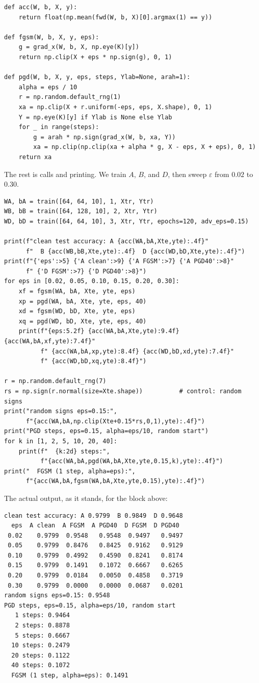 \begin{lab}
\begin{verbatim}
def acc(W, b, X, y):
    return float(np.mean(fwd(W, b, X)[0].argmax(1) == y))

def fgsm(W, b, X, y, eps):
    g = grad_x(W, b, X, np.eye(K)[y])
    return np.clip(X + eps * np.sign(g), 0, 1)

def pgd(W, b, X, y, eps, steps, Ylab=None, arah=1):
    alpha = eps / 10
    r = np.random.default_rng(1)
    xa = np.clip(X + r.uniform(-eps, eps, X.shape), 0, 1)
    Y = np.eye(K)[y] if Ylab is None else Ylab
    for _ in range(steps):
        g = arah * np.sign(grad_x(W, b, xa, Y))
        xa = np.clip(np.clip(xa + alpha * g, X - eps, X + eps), 0, 1)
    return xa
\end{verbatim}
\end{lab}

The rest is calls and printing. We train $A$, $B$, and $D$, then sweep
$\varepsilon$ from $0.02$ to $0.30$.

\begin{verbatim}
WA, bA = train([64, 64, 10], 1, Xtr, Ytr)
WB, bB = train([64, 128, 10], 2, Xtr, Ytr)
WD, bD = train([64, 64, 10], 3, Xtr, Ytr, epochs=120, adv_eps=0.15)

print(f"clean test accuracy: A {acc(WA,bA,Xte,yte):.4f}"
      f"  B {acc(WB,bB,Xte,yte):.4f}  D {acc(WD,bD,Xte,yte):.4f}")
print(f"{'eps':>5} {'A clean':>9} {'A FGSM':>7} {'A PGD40':>8}"
      f" {'D FGSM':>7} {'D PGD40':>8}")
for eps in [0.02, 0.05, 0.10, 0.15, 0.20, 0.30]:
    xf = fgsm(WA, bA, Xte, yte, eps)
    xp = pgd(WA, bA, Xte, yte, eps, 40)
    xd = fgsm(WD, bD, Xte, yte, eps)
    xq = pgd(WD, bD, Xte, yte, eps, 40)
    print(f"{eps:5.2f} {acc(WA,bA,Xte,yte):9.4f} {acc(WA,bA,xf,yte):7.4f}"
          f" {acc(WA,bA,xp,yte):8.4f} {acc(WD,bD,xd,yte):7.4f}"
          f" {acc(WD,bD,xq,yte):8.4f}")

r = np.random.default_rng(7)
rs = np.sign(r.normal(size=Xte.shape))          # control: random signs
print("random signs eps=0.15:",
      f"{acc(WA,bA,np.clip(Xte+0.15*rs,0,1),yte):.4f}")
print("PGD steps, eps=0.15, alpha=eps/10, random start")
for k in [1, 2, 5, 10, 20, 40]:
    print(f"  {k:2d} steps:",
          f"{acc(WA,bA,pgd(WA,bA,Xte,yte,0.15,k),yte):.4f}")
print("  FGSM (1 step, alpha=eps):",
      f"{acc(WA,bA,fgsm(WA,bA,Xte,yte,0.15),yte):.4f}")
\end{verbatim}

The actual output, as it stands, for the block above:

\begin{verbatim}
clean test accuracy: A 0.9799  B 0.9849  D 0.9648
  eps  A clean  A FGSM  A PGD40  D FGSM  D PGD40
 0.02    0.9799  0.9548   0.9548  0.9497   0.9497
 0.05    0.9799  0.8476   0.8425  0.9162   0.9129
 0.10    0.9799  0.4992   0.4590  0.8241   0.8174
 0.15    0.9799  0.1491   0.1072  0.6667   0.6265
 0.20    0.9799  0.0184   0.0050  0.4858   0.3719
 0.30    0.9799  0.0000   0.0000  0.0687   0.0201
random signs eps=0.15: 0.9548
PGD steps, eps=0.15, alpha=eps/10, random start
   1 steps: 0.9464
   2 steps: 0.8878
   5 steps: 0.6667
  10 steps: 0.2479
  20 steps: 0.1122
  40 steps: 0.1072
  FGSM (1 step, alpha=eps): 0.1491
\end{verbatim}

